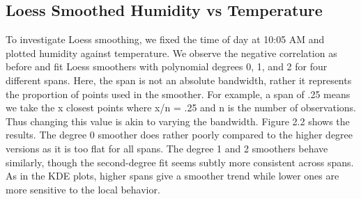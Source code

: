 \documentclass[english]{article}\usepackage{graphicx, color}
\numberwithin{equation}{section}
\numberwithin{figure}{section}
\begin{document}
\subsection{Loess Smoothed Humidity vs Temperature}

To investigate Loess smoothing, we fixed the time of day at 10:05 AM and plotted humidity against temperature. We observe the negative correlation as before and fit Loess smoothers with polynomial degrees 0, 1, and 2 for four different spans. Here, the span is not an absolute bandwidth, rather it represents the proportion of points used in the smoother. For example, a span of .25 means we take the x closest points where x/n = .25 and n is the number of observations. Thus changing this value is akin to varying the bandwidth. Figure 2.2 shows the results. The degree 0 smoother does rather poorly compared to the higher degree versions as it is too flat for all spans. The degree 1 and 2 smoothers behave similarly, though the second-degree fit seems subtly more consistent across spans. As in the KDE plots, higher spans give a smoother trend while lower ones are more sensitive to the local behavior. 
\end{document}
